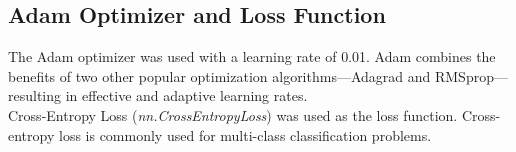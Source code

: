 \subsection*{Adam Optimizer and Loss Function}
The Adam optimizer \cite{AdamOptim} was used with a learning rate of 0.01. Adam combines the benefits of two other popular optimization algorithms—Adagrad and RMSprop—resulting in effective and adaptive learning rates. \\

\noindent Cross-Entropy Loss (\textit{nn.CrossEntropyLoss}) \cite{LossFunction} was used as the loss function. Cross-entropy loss is commonly used for multi-class classification problems.